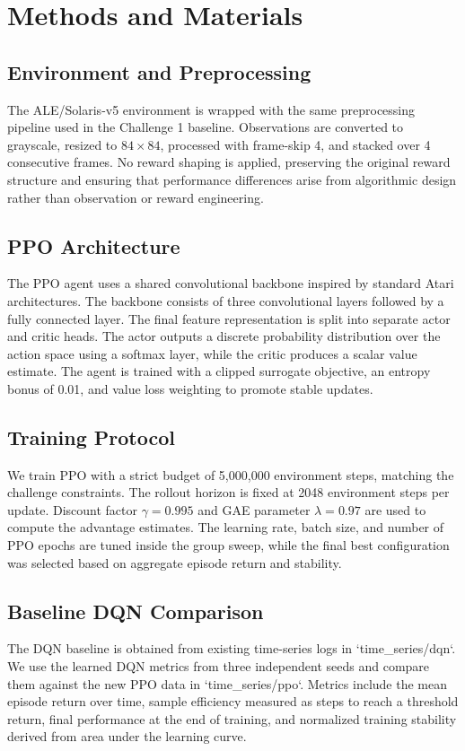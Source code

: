 \documentclass[conference]{IEEEtran}
\begin{document}
\section{Methods and Materials}
\subsection{Environment and Preprocessing}
The ALE/Solaris-v5 environment is wrapped with the same preprocessing pipeline used in the Challenge 1 baseline. Observations are converted to grayscale, resized to $84 \times 84$, processed with frame-skip 4, and stacked over 4 consecutive frames. No reward shaping is applied, preserving the original reward structure and ensuring that performance differences arise from algorithmic design rather than observation or reward engineering.

\subsection{PPO Architecture}
The PPO agent uses a shared convolutional backbone inspired by standard Atari architectures. The backbone consists of three convolutional layers followed by a fully connected layer. The final feature representation is split into separate actor and critic heads. The actor outputs a discrete probability distribution over the action space using a softmax layer, while the critic produces a scalar value estimate. The agent is trained with a clipped surrogate objective, an entropy bonus of 0.01, and value loss weighting to promote stable updates.

\subsection{Training Protocol}
We train PPO with a strict budget of 5,000,000 environment steps, matching the challenge constraints. The rollout horizon is fixed at 2048 environment steps per update. Discount factor $\gamma=0.995$ and GAE parameter $\lambda=0.97$ are used to compute the advantage estimates. The learning rate, batch size, and number of PPO epochs are tuned inside the group sweep, while the final best configuration was selected based on aggregate episode return and stability.

\subsection{Baseline DQN Comparison}
The DQN baseline is obtained from existing time-series logs in `time_series/dqn`. We use the learned DQN metrics from three independent seeds and compare them against the new PPO data in `time_series/ppo`. Metrics include the mean episode return over time, sample efficiency measured as steps to reach a threshold return, final performance at the end of training, and normalized training stability derived from area under the learning curve.
\end{document}
